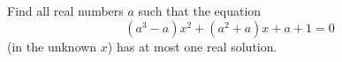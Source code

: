 Find all real numbers $a$ such that the equation
\[(a^3-a)x^2+(a^2+a)x+a+1=0\]
(in the unknown $x$) has at most one real solution.
